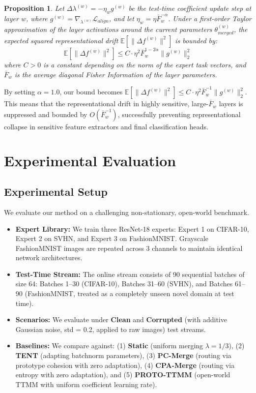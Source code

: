 \documentclass{article}
\theoremstyle{plain}
\newtheorem{proposition}[theorem]{Proposition}
\theoremstyle{definition}
\theoremstyle{remark}
\begin{document}
\begin{proposition}
  Let $\Delta \lambda^{(w)} = -\eta_w g^{(w)}$ be the test-time coefficient update step at layer $w$, where $g^{(w)} = \nabla_{\lambda^{(w)}} \mathcal{L}_{align}$, and let $\eta_w = \eta \bar{F}_w^{-\alpha}$. Under a first-order Taylor approximation of the layer activations around the current parameters $\theta_{merged}^{(w)}$, the expected squared representational drift $\mathbb{E}[\|\Delta f^{(w)}\|^2]$ is bounded by:
  \begin{equation}
    \mathbb{E}[\|\Delta f^{(w)}\|^2] \leq C \cdot \eta^2 \bar{F}_w^{1-2\alpha} \|g^{(w)}\|_2^2
  \end{equation}
  where $C > 0$ is a constant depending on the norm of the expert task vectors, and $\bar{F}_w$ is the average diagonal Fisher Information of the layer parameters.
\end{proposition}

By setting $\alpha = 1.0$, our bound becomes $\mathbb{E}[\|\Delta f^{(w)}\|^2] \leq C \cdot \eta^2 \bar{F}_w^{-1} \|g^{(w)}\|_2^2$. This means that the representational drift in highly sensitive, large-$\bar{F}_w$ layers is suppressed and bounded by $O(\bar{F}_w^{-1})$, successfully preventing representational collapse in sensitive feature extractors and final classification heads.

\section{Experimental Evaluation}
\label{experimental-evaluation}

\subsection{Experimental Setup}
We evaluate our method on a challenging non-stationary, open-world benchmark.
\begin{itemize}
  \item \textbf{Expert Library:} We train three ResNet-18 \cite{resnet} experts: Expert 1 on CIFAR-10, Expert 2 on SVHN, and Expert 3 on FashionMNIST. Grayscale FashionMNIST images are repeated across 3 channels to maintain identical network architectures.
  \item \textbf{Test-Time Stream:} The online stream consists of 90 sequential batches of size 64: Batches 1--30 (CIFAR-10), Batches 31--60 (SVHN), and Batches 61--90 (FashionMNIST, treated as a completely unseen novel domain at test time).
  \item \textbf{Scenarios:} We evaluate under \textbf{Clean} and \textbf{Corrupted} (with additive Gaussian noise, std = 0.2, applied to raw images) test streams.
  \item \textbf{Baselines:} We compare against: (1) \textbf{Static} (uniform merging $\lambda = 1/3$), (2) \textbf{TENT} \cite{tent} (adapting batchnorm parameters), (3) \textbf{PC-Merge} (routing via prototype cohesion with zero adaptation), (4) \textbf{CPA-Merge} (routing via entropy with zero adaptation), and (5) \textbf{PROTO-TTMM} \cite{proto_ttmm} (open-world TTMM with uniform coefficient learning rate).
\end{itemize}
\end{document}
